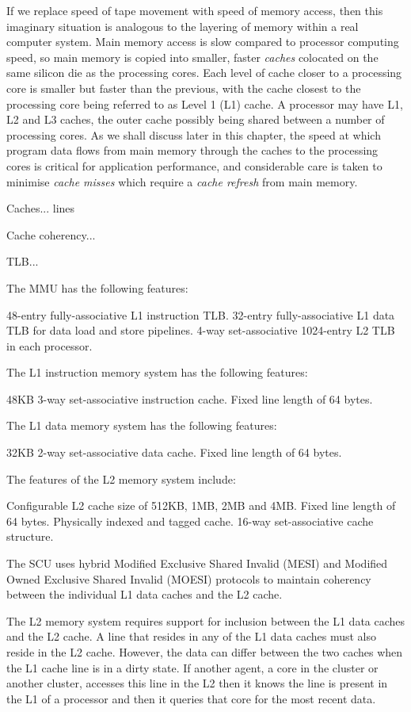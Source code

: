 \documentclass{report}
\begin{document}
If we replace speed of tape movement with speed of memory access, then this imaginary situation is analogous to the layering of memory within a real computer system. Main memory access is slow compared to processor computing speed, so main memory is copied into smaller, faster \emph{caches} colocated on the same silicon die as the processing cores. Each level of cache closer to a processing core is smaller but faster than the previous, with the cache closest to the processing core being referred to as Level 1 (L1) cache. A processor may have L1, L2 and L3 caches, the outer cache possibly being shared between a number of processing cores. As we shall discuss later in this chapter, the speed at which program data flows from main memory through the caches to the processing cores is critical for application performance, and considerable care is taken to minimise \emph{cache misses} which require a \emph{cache refresh} from main memory.

Caches... lines

Cache coherency...

TLB...

The MMU has the following features:

48-entry fully-associative L1 instruction TLB.
32-entry fully-associative L1 data TLB for data load and store pipelines.
4-way set-associative 1024-entry L2 TLB in each processor.

The L1 instruction memory system has the following features:

48KB 3-way set-associative instruction cache.
Fixed line length of 64 bytes.

The L1 data memory system has the following features:

32KB 2-way set-associative data cache.
Fixed line length of 64 bytes.

The features of the L2 memory system include:

Configurable L2 cache size of 512KB, 1MB, 2MB and 4MB.
Fixed line length of 64 bytes.
Physically indexed and tagged cache.
16-way set-associative cache structure.

The SCU uses hybrid Modified Exclusive Shared Invalid (MESI) and Modified Owned Exclusive Shared Invalid (MOESI) protocols to maintain coherency between the individual L1 data caches and the L2 cache.

The L2 memory system requires support for inclusion between the L1 data caches and the L2 cache. A line that resides in any of the L1 data caches must also reside in the L2 cache. However, the data can differ between the two caches when the L1 cache line is in a dirty state. If another agent, a core in the cluster or another cluster, accesses this line in the L2 then it knows the line is present in the L1 of a processor and then it queries that core for the most recent data.
\end{document}
